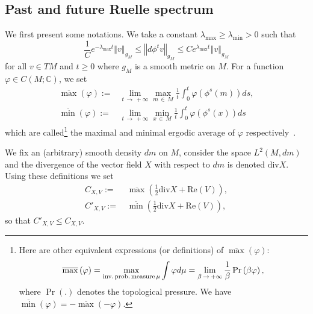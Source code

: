 \documentclass[10pt]{amsart}
\theoremstyle{definition}\newtheorem{defi}[theo]{Definition}\newtheorem{rema}[theo]{Remark}\newtheorem{exam}[theo]{Example}\newtheorem{exem}[theo]{Example}\newtheorem{nota}[theo]{Notation}
\newcommand{\Ree}{\mathrm{Re}}
\newcommand{\divv}{\mathrm{div}}
\newcommand{\bbC}{\mathbb{C}}
\begin{document}
\subsection{Past and future Ruelle spectrum}

We first present some notations. We take a constant $\lambda_{\max}\geq\lambda_{\min}>0$ such that
\begin{equation}\label{eq:l_max}
\frac{1}{C}e^{-\lambda_{\max}t}\left\Vert v\right\Vert _{g_{M}}\le\left\Vert d\phi^{t}v\right\Vert _{g_{M}}\leq Ce^{\lambda_{\max}t}\left\Vert v\right\Vert _{g_{M}}
\end{equation}
for all $v\in TM$ and $t\ge0$ where $g_{M}$ is a smooth metric on $M$. For a function $\varphi\in C(M;\bbC)$, we set
\begin{align}
\overline{\max}\left(\varphi\right):=& \lim_{t\, \rightarrow\,+\infty}\max_{m\,\in\,M}\frac{1}{t}\int_{0}^{t}\varphi\left(\phi^{s}\left(m\right)\right)ds,\label{eq:def_tmax}
\\
\overline{\min}\left(\varphi\right):=& \lim_{t\,\rightarrow\,+\infty}\min_{x\,\in\,M}\frac{1}{t}\int_{0}^{t}\varphi\left(\phi^{s}\left(x\right)\right)ds\label{eq:def_tmin}
\end{align}
which are called\footnote{Here are other equivalent expressions (or definitions) of $\overline{\max}(\varphi)$:
\[
\overline{\max}\left(\varphi\right)=\max_{\text{inv.\,prob.\,measure\,}\mu}\int\varphi d\mu=\lim_{\beta\,\rightarrow\,+\infty}\frac{1}{\beta}\Pr\left(\beta\varphi\right),
\]
where $\Pr(.)$ denotes the topological pressure. We have $\overline{\min}(\varphi)=-\overline{\max}(-\varphi)$.} the maximal and minimal ergodic average of $\varphi$ respectively~\cite{jenkinson_2018}.

We fix an (arbitrary) smooth density $dm$ on $M$, consider the space $L^{2}(M,dm)$ and the divergence of the vector field $X$ with respect to $dm$ is denoted $\divv X$. Using these definitions we set
\begin{align}
C_{X,V}:=&\,\overline{\max}\left(\frac{1}{2}\divv X+\Ree\left(V\right)\right),\label{eq:C_XV}
\\
C'_{X,V}:=&\, \overline{\min}\left(\frac{1}{2}\divv X+\Ree\left(V\right)\right),\label{eq:C_XV-1}
\end{align}
so that $C'_{X,V}\leq C_{X,V}$.
\end{document}
